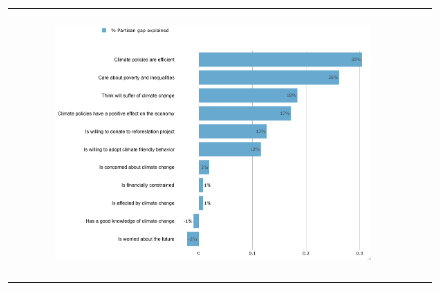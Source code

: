 \documentclass{article}
\begin{document}
\begin{figure}[h!]
\begin{center}
\begin{tabular}{cc}
\begin{subfigure}{0.5\textwidth}
			\includegraphics[width=\textwidth]{gelbach_right_tax_transfers_D2SD}
		\end{subfigure}\\
	\end{tabular}


\end{center}
\end{figure}
\end{document}
